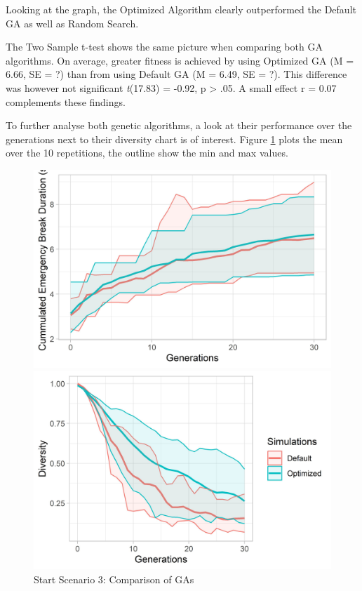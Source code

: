 Looking at the graph, the Optimized Algorithm clearly outperformed the Default GA as well as Random Search.

The Two Sample t-test shows the same picture when comparing both GA algorithms. On average, greater fitness is achieved by using Optimized GA (M = 6.66, SE = ?) than from using Default GA (M = 6.49, SE = ?). This difference was however not significant \textit{t}(17.83) = -0.92, p > .05. A small effect r = 0.07 complements these findings.

To further analyse both genetic algorithms, a look at their performance over the generations next to their diversity chart is of interest. Figure \ref{figure:sim_3_ga_comparison} plots the mean over the 10 repetitions, the outline show the min and max values.

\begin{figure}[ht] 
	\label{figure:sim_3_ga_comparison}
	\begin{minipage}[b]{0.5\linewidth}
		\centering
		\includegraphics[width=1\linewidth]{simulations/evaluation/plots/sim_3_ga_generations} 
	\end{minipage}%
	\begin{minipage}[b]{0.5\linewidth}
		\centering
		\includegraphics[width=1\linewidth]{simulations/evaluation/plots/sim_3_ga_diversity} 
	\end{minipage} 
	\caption{Start Scenario 3: Comparison of GAs}
\end{figure}


